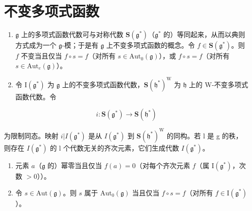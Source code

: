 \section*{不变多项式函数}

\begin{enumerate}
\def\labelenumi{\arabic{enumi})}
\setcounter{enumi}{28}
\item
  \(\mathfrak{g}\) 上的多项式函数代数可与对称代数 \(\mathbf{S}(\mathfrak{g}^*)\)（\(\mathfrak{g}^*\) 的）等同起来，从而以典则方式成为一个 \(\mathfrak{g}\)-模；于是有 \(\mathfrak{g}\) 上不变多项式函数的概念。令 \(f \in \mathbf{S}(\mathfrak{g}^*)\)。则 \(f\) 不变当且仅当 \(f \circ s = f\)（对所有 \(s \in \mathrm{Aut}_0(\mathfrak{g})\)），或 \(f \circ s = f\)（对所有 \(s \in \mathrm{Aut}_e(\mathfrak{g})\)）。
\item
  令 \(\mathrm{I}(\mathfrak{g}^*)\) 为 \(\mathfrak{g}\) 上的不变多项式函数代数，\(\mathbf{S}(\mathfrak{h}^*)^{\mathrm{W}}\) 为 \(\mathfrak{h}\) 上的 W-不变多项式函数代数。令
\end{enumerate}

\[
i: \mathbf {S} (\mathfrak {g} ^ {*}) \to \mathbf {S} (\mathfrak {h} ^ {*})
\]

为限制同态。映射 \(i|I(\mathfrak{g}^{*})\) 是从 \(I(\mathfrak{g}^{*})\) 到 \(\mathbf{S}(\mathfrak{h}^{*})^{\mathrm{W}}\) 的同构。若 l 是 g 的秩，则存在 \(I(\mathfrak{g}^{*})\) 的 l 个代数无关的齐次元素，它们生成代数 \(I(\mathfrak{g}^{*})\)。

\begin{enumerate}
\def\labelenumi{\arabic{enumi})}
\setcounter{enumi}{30}
\item
  元素 \(a\)（\(\mathfrak{g}\) 的）幂零当且仅当 \(f(a) = 0\)（对每个齐次元素 \(f\)（属 \(\mathrm{I}(\mathfrak{g}^*)\)，次数 \(> 0\)））。
\item
  令 \(s \in \mathrm{Aut}(\mathfrak{g})\)。则 \(s\) 属于 \(\mathrm{Aut}_0(\mathfrak{g})\) 当且仅当 \(f \circ s = f\)（对所有 \(f \in \mathrm{I}(\mathfrak{g}^*)\)）。
\end{enumerate}

